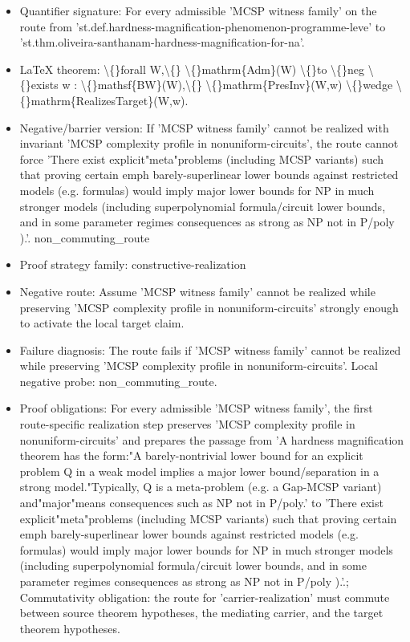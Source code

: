 \documentclass[11pt]{article}
\begin{document}
\begin{itemize}
\item Quantifier signature: For every admissible 'MCSP witness family' on the route from 'st.def.hardness-magnification-phenomenon-programme-leve' to 'st.thm.oliveira-santhanam-hardness-magnification-for-na'.
\item LaTeX theorem: \textbackslash\{\}forall W,\textbackslash\{\} \textbackslash\{\}mathrm\{Adm\}(W) \textbackslash\{\}to \textbackslash\{\}neg \textbackslash\{\}exists w : \textbackslash\{\}mathsf\{BW\}(W),\textbackslash\{\} \textbackslash\{\}mathrm\{PresInv\}(W,w) \textbackslash\{\}wedge \textbackslash\{\}mathrm\{RealizesTarget\}(W,w).
\item Negative/barrier version: If 'MCSP witness family' cannot be realized with invariant 'MCSP complexity profile in nonuniform-circuits', the route cannot force 'There exist explicit"meta"problems (including MCSP variants) such that proving certain emph barely-superlinear lower bounds against restricted models (e.g. formulas) would imply major lower bounds for NP in much stronger models (including superpolynomial formula/circuit lower bounds, and in some parameter regimes consequences as strong as NP not in P/poly ).'. non\_commuting\_route
\item Proof strategy family: constructive-realization
\item Negative route: Assume 'MCSP witness family' cannot be realized while preserving 'MCSP complexity profile in nonuniform-circuits' strongly enough to activate the local target claim.
\item Failure diagnosis: The route fails if 'MCSP witness family' cannot be realized while preserving 'MCSP complexity profile in nonuniform-circuits'. Local negative probe: non\_commuting\_route.
\item Proof obligations: For every admissible 'MCSP witness family', the first route-specific realization step preserves 'MCSP complexity profile in nonuniform-circuits' and prepares the passage from 'A hardness magnification theorem has the form:"A barely-nontrivial lower bound for an explicit problem Q in a weak model implies a major lower bound/separation in a strong model."Typically, Q is a meta-problem (e.g. a Gap-MCSP variant) and"major"means consequences such as NP not in P/poly.' to 'There exist explicit"meta"problems (including MCSP variants) such that proving certain emph barely-superlinear lower bounds against restricted models (e.g. formulas) would imply major lower bounds for NP in much stronger models (including superpolynomial formula/circuit lower bounds, and in some parameter regimes consequences as strong as NP not in P/poly ).'.; Commutativity obligation: the route for 'carrier-realization' must commute between source theorem hypotheses, the mediating carrier, and the target theorem hypotheses.

\end{itemize}
\end{document}
